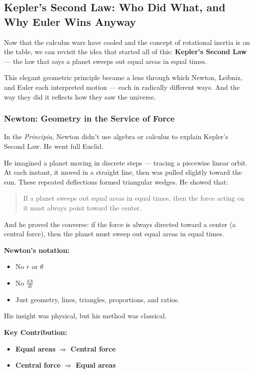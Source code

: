\subsection{Kepler’s Second Law: Who Did What, and Why Euler Wins Anyway}

Now that the calculus wars have cooled and the concept of rotational inertia is on the table, we can revisit the idea that started all of this: \textbf{Kepler’s Second Law} — the law that says a planet sweeps out equal areas in equal times.

This elegant geometric principle became a lens through which Newton, Leibniz, and Euler each interpreted motion — each in radically different ways. And the way they did it reflects how they saw the universe.

\subsubsection{Newton: Geometry in the Service of Force}

In the \textit{Principia}, Newton didn’t use algebra or calculus to explain Kepler’s Second Law. He went full Euclid.

He imagined a planet moving in discrete steps — tracing a piecewise linear orbit. At each instant, it moved in a straight line, then was pulled slightly toward the sun. These repeated deflections formed triangular wedges. He showed that:

\begin{quote}
If a planet sweeps out equal areas in equal times, then the force acting on it must always point toward the center.
\end{quote}

And he proved the converse: if the force is always directed toward a center (a central force), then the planet must sweep out equal areas in equal times.

\textbf{Newton’s notation:}
\begin{itemize}
    \item No \( r \) or \( \theta \)
    \item No \( \frac{dA}{dt} \)
    \item Just geometry, lines, triangles, proportions, and ratios.
\end{itemize}

His insight was physical, but his method was classical.

\textbf{Key Contribution:}
\begin{itemize}
    \item \textbf{Equal areas} \(\Rightarrow\) \textbf{Central force}
    \item \textbf{Central force} \(\Rightarrow\) \textbf{Equal areas}
\end{itemize}

